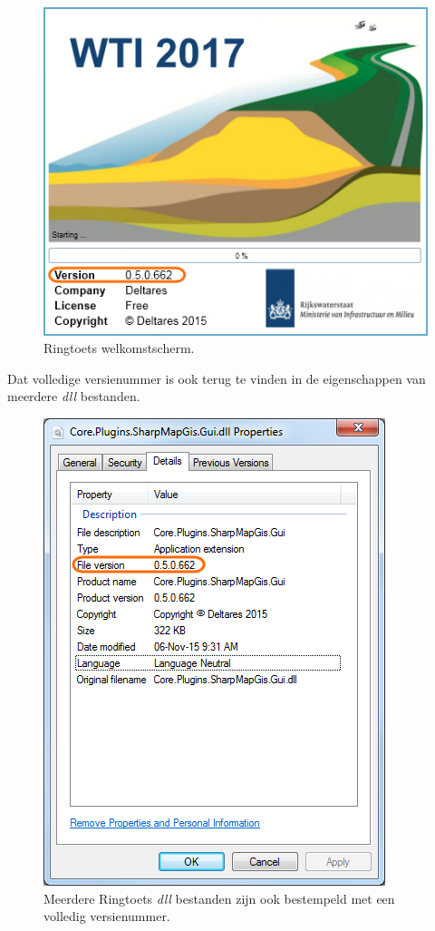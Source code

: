 \begin{figure} [H]
	\centering
		\includegraphics{figures/chapter_installation/rtSplashScreen}
	\caption{Ringtoets welkomstscherm.}
	\label{fig:figinstall.splashScreen}
\end{figure}

Dat volledige versienummer is ook terug te vinden in de eigenschappen van meerdere \textit{dll} bestanden.


\begin{figure} [H]
	\centering
		\includegraphics{figures/chapter_installation/rtVersionNUmberInDlls}
	\caption{Meerdere Ringtoets \textit{dll }bestanden zijn ook bestempeld met een volledig versienummer.}
	\label{fig:figinstall.rtVersionNUmberInDlls}
\end{figure}









